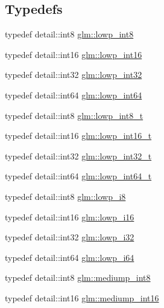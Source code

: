 \subsection*{Typedefs}
\begin{DoxyCompactItemize}
\item 
typedef detail\+::int8 \hyperlink{group__gtc__type__precision_gaf9e675b6392764242ae87eb179e9d3d6}{glm\+::lowp\+\_\+int8}
\item 
typedef detail\+::int16 \hyperlink{group__gtc__type__precision_ga71fc0c399fa4780507748b643733f153}{glm\+::lowp\+\_\+int16}
\item 
typedef detail\+::int32 \hyperlink{group__gtc__type__precision_gad9939c9d6fec1c6accc02a83c6500f08}{glm\+::lowp\+\_\+int32}
\item 
typedef detail\+::int64 \hyperlink{group__gtc__type__precision_gab8a8e75af347592406e41b3ae2c0712b}{glm\+::lowp\+\_\+int64}
\item 
typedef detail\+::int8 \hyperlink{group__gtc__type__precision_gae6092311f6970a305c2df19a372360a3}{glm\+::lowp\+\_\+int8\+\_\+t}
\item 
typedef detail\+::int16 \hyperlink{group__gtc__type__precision_gae34c3d53c4c1434fc9f26538b0185667}{glm\+::lowp\+\_\+int16\+\_\+t}
\item 
typedef detail\+::int32 \hyperlink{group__gtc__type__precision_gad9567c806dc39f534174eef42663119d}{glm\+::lowp\+\_\+int32\+\_\+t}
\item 
typedef detail\+::int64 \hyperlink{group__gtc__type__precision_ga14d72e76d57c7f28eca8e933816c9fd6}{glm\+::lowp\+\_\+int64\+\_\+t}
\item 
typedef detail\+::int8 \hyperlink{group__gtc__type__precision_gaa2e13ee29c90f75658beed6082541097}{glm\+::lowp\+\_\+i8}
\item 
typedef detail\+::int16 \hyperlink{group__gtc__type__precision_gaf7bbfd31bcec25a416ea94d09efb5451}{glm\+::lowp\+\_\+i16}
\item 
typedef detail\+::int32 \hyperlink{group__gtc__type__precision_ga70fd34e8b8cffc92739161284ed77328}{glm\+::lowp\+\_\+i32}
\item 
typedef detail\+::int64 \hyperlink{group__gtc__type__precision_ga1f4ded25f71c0f3b4518936d50b54b6e}{glm\+::lowp\+\_\+i64}
\item 
typedef detail\+::int8 \hyperlink{group__gtc__type__precision_ga3ee8faab2278c44c5785af04b7b18a14}{glm\+::mediump\+\_\+int8}
\item 
typedef detail\+::int16 \hyperlink{group__gtc__type__precision_ga4611997edb6c61606daa11990cf08798}{glm\+::mediump\+\_\+int16}

\end{DoxyCompactItemize}
